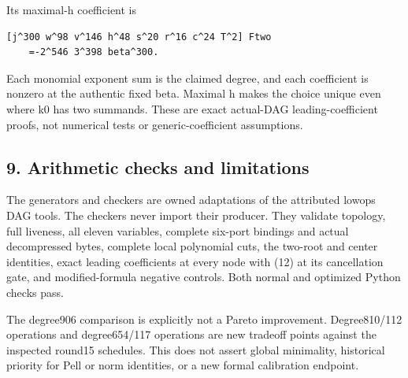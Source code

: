 Its maximal-h coefficient is



\begin{verbatim}
[j^300 w^98 v^146 h^48 s^20 r^16 c^24 T^2] Ftwo
    =-2^546 3^398 beta^300.
\end{verbatim}

Each monomial exponent sum is the claimed degree, and each coefficient is nonzero at the authentic fixed beta. Maximal h makes the choice unique even where k0 has two summands. These are exact actual-DAG leading-coefficient proofs, not numerical tests or generic-coefficient assumptions.



\subsection{9. Arithmetic checks and limitations}



The generators and checkers are owned adaptations of the attributed lowops DAG tools. The checkers never import their producer. They validate topology, full liveness, all eleven variables, complete six-port bindings and actual decompressed bytes, complete local polynomial cuts, the two-root and center identities, exact leading coefficients at every node with (12) at its cancellation gate, and modified-formula negative controls. Both normal and optimized Python checks pass.



The degree906 comparison is explicitly not a Pareto improvement. Degree810/\allowbreak{}112 operations and degree654/\allowbreak{}117 operations are new tradeoff points against the inspected round15 schedules. This does not assert global minimality, historical priority for Pell or norm identities, or a new formal calibration endpoint.
